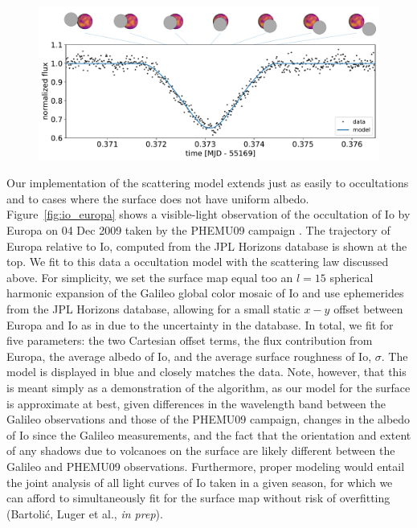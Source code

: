\documentclass[modern]{aastex62}
\begin{document}
\begin{figure}[t!]
    \begin{centering}
        \includegraphics[width=\linewidth]{figures/io_europa.pdf}
    \end{centering}
\end{figure}

Our implementation of the scattering model extends just as easily
to occultations and to cases where the surface does not have uniform albedo.
Figure~\ref{fig:io_europa} shows a visible-light observation of the
occultation of Io by Europa on 04 Dec 2009 taken by the PHEMU09
campaign \citep{Arlot2014}. The trajectory of Europa relative to Io,
computed from the JPL Horizons database 
is shown at the top. We fit to this data a \starry occultation model
with the scattering law discussed above.
For simplicity, we set the surface map equal too
an $l=15$ spherical harmonic expansion of the Galileo global color mosaic
of Io \citep{Becker2005} and use ephemerides from the JPL Horizons
database, allowing for a small static $x-y$ offset between Europa and Io as
in \citep{Arlot2014} due to the uncertainty in the database. In total,
we fit for five parameters: the two Cartesian offset terms,
the flux contribution from Europa, the average
albedo of Io, and the average surface roughness of Io, $\sigma$. The model
is displayed in blue and closely matches the data.
%
Note, however, that this is meant simply as a demonstration of the \starry
algorithm, as our model for the surface is approximate at best, given
differences in the wavelength band between the Galileo observations and
those of the PHEMU09 campaign, changes in the albedo of Io since the Galileo
measurements, and the fact that the orientation and extent of any shadows
due to volcanoes on the surface are likely different between the Galileo
and PHEMU09 observations. Furthermore,
proper modeling would entail the
joint analysis of all light curves of Io taken in a given season, for which
we can afford to simultaneously fit for the surface map without risk of
overfitting (Bartoli\'c, Luger et al., \emph{in prep}).
\end{document}

